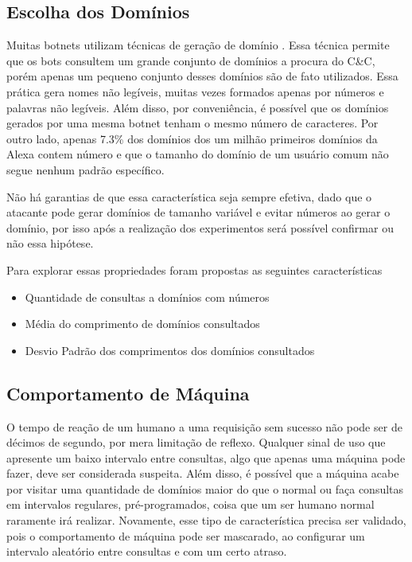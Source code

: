 \subsection{Escolha dos Domínios}
Muitas botnets utilizam técnicas de geração de domínio \citep{zhou2013dga}. Essa técnica permite que os bots consultem um grande conjunto de domínios a procura do C\&C, porém apenas um pequeno conjunto desses domínios são de fato utilizados. Essa prática gera nomes não legíveis, muitas vezes formados apenas por números e palavras não legíveis. Além disso, por conveniência, é possível que os domínios gerados por uma mesma botnet tenham o mesmo número de caracteres. Por outro lado, apenas 7.3\% dos domínios dos um milhão primeiros domínios da Alexa contem número e que o tamanho do domínio de um usuário comum não segue nenhum padrão específico.

Não há garantias de que essa característica seja sempre efetiva, dado que o atacante pode gerar domínios de tamanho variável e evitar números ao gerar o domínio, por isso após a realização dos experimentos será possível confirmar ou não essa hipótese.

Para explorar essas propriedades foram propostas as seguintes características 

\begin{itemize}
\item Quantidade de consultas a domínios com números 
\item Média do comprimento de domínios consultados
\item Desvio Padrão dos comprimentos dos domínios consultados
\end{itemize}

\subsection{Comportamento de Máquina}

O tempo de reação de um humano a uma requisição sem sucesso não pode ser de décimos de segundo, por mera limitação de reflexo. Qualquer sinal de uso que apresente um baixo intervalo entre consultas, algo que apenas uma máquina pode fazer, deve ser considerada suspeita. Além disso, é possível que a máquina acabe por visitar uma quantidade de domínios maior do que o normal ou faça consultas em intervalos regulares, pré-programados, coisa que um ser humano normal raramente irá realizar. Novamente, esse tipo de característica precisa ser validado, pois o comportamento de máquina pode ser mascarado, ao configurar um intervalo aleatório entre consultas e com um certo atraso.

